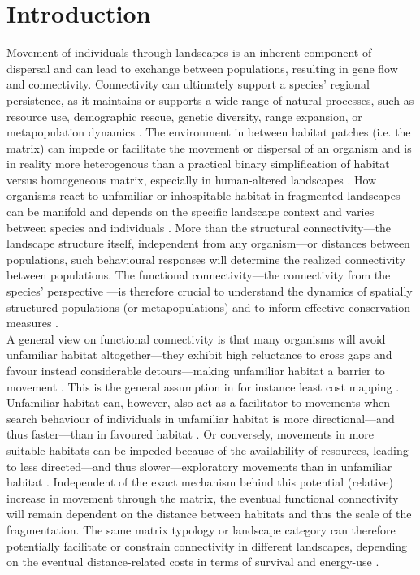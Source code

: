 \documentclass[10pt, twoside]{book} %
\begin{document}
	\section{Introduction}
	Movement of individuals through landscapes is an inherent component of dispersal and can lead to exchange between populations, resulting in gene flow and connectivity. Connectivity can ultimately support a species' regional persistence, as it maintains or supports a wide range of natural processes, such as resource use, demographic rescue, genetic diversity, range expansion, or metapopulation dynamics \citep{hanski1998, crooks2006, mcrae2008, hodgson2022}. The environment in between habitat patches (i.e. the matrix) can impede or facilitate the movement or dispersal of an organism and is in reality more heterogenous than a practical binary simplification of habitat versus homogeneous matrix, especially in human-altered landscapes \citep{hein2003, manel2013}. How organisms react to unfamiliar or inhospitable habitat in fragmented landscapes can be manifold and depends on the specific landscape context and varies between species and individuals \citep{baguette2007, knowlton2010}. More than the structural connectivity---the landscape structure itself, independent from any organism---or distances between populations, such behavioural responses will determine the realized connectivity between populations. The functional connectivity---the connectivity from the species' perspective \citep{tischendorf2000}---is therefore crucial to understand the dynamics of spatially structured populations (or metapopulations) and to inform effective conservation measures \citep{mcrae2006}.\\
	
	A general view on functional connectivity is that many organisms will avoid unfamiliar habitat altogether---they exhibit high reluctance to cross gaps and favour instead considerable detours---making unfamiliar habitat a barrier to movement \citep{develey2008, knowlton2010, driscoll2013}. This is the general assumption in for instance least cost mapping \citep{adriaensen2003}. Unfamiliar habitat can, however, also act as a facilitator to movements when search behaviour of individuals in unfamiliar habitat is more directional---and thus faster---than in favoured habitat \citep{vandyck2005, schtickzelle2006, kuefler2010, knowlton2010}. Or conversely, movements in more suitable habitats can be impeded because of the availability of resources, leading to less directed---and thus slower---exploratory movements than in unfamiliar habitat \citep{vandyck2005, mcrae2008, keller2012}. Independent of the exact mechanism behind this potential (relative) increase in movement through the matrix, the eventual functional connectivity will remain dependent on the distance between habitats and thus the scale of the fragmentation. The same matrix typology or landscape category can therefore potentially facilitate or constrain connectivity in different landscapes, depending on the eventual distance-related costs in terms of survival and energy-use \citep{segelbacher2010, spear2010, bonte2012, richardson2016, haran2017}.\\
	
\end{document}
